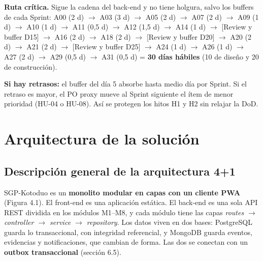 \documentclass[11pt,a4paper]{article}
\begin{document}
\textbf{Ruta crítica.} Sigue la cadena del back-end y no tiene holgura, salvo los buffers de cada Sprint: A00 (2 d) \ensuremath{\rightarrow}\allowbreak{} A03 (3 d) \ensuremath{\rightarrow}\allowbreak{} A05 (2 d) \ensuremath{\rightarrow}\allowbreak{} A07 (2 d) \ensuremath{\rightarrow}\allowbreak{} A09 (1 d) \ensuremath{\rightarrow}\allowbreak{} A10 (1 d) \ensuremath{\rightarrow}\allowbreak{} A11 (0,5 d) \ensuremath{\rightarrow}\allowbreak{} A12 (1,5 d) \ensuremath{\rightarrow}\allowbreak{} A14 (1 d) \ensuremath{\rightarrow}\allowbreak{} [Review y buffer D15] \ensuremath{\rightarrow}\allowbreak{} A16 (2 d) \ensuremath{\rightarrow}\allowbreak{} A18 (2 d) \ensuremath{\rightarrow}\allowbreak{} [Review y buffer D20] \ensuremath{\rightarrow}\allowbreak{} A20 (2 d) \ensuremath{\rightarrow}\allowbreak{} A21 (2 d) \ensuremath{\rightarrow}\allowbreak{} [Review y buffer D25] \ensuremath{\rightarrow}\allowbreak{} A24 (1 d) \ensuremath{\rightarrow}\allowbreak{} A26 (1 d) \ensuremath{\rightarrow}\allowbreak{} A27 (2 d) \ensuremath{\rightarrow}\allowbreak{} A29 (0,5 d) \ensuremath{\rightarrow}\allowbreak{} A31 (0,5 d) = \textbf{30 días hábiles} (10 de diseño y 20 de construcción).

\textbf{Si hay retrasos:} el buffer del día 5 absorbe hasta medio día por Sprint. Si el retraso es mayor, el PO proxy mueve al Sprint siguiente el ítem de menor prioridad (HU-04 o HU-08). Así se protegen los hitos H1 y H2 sin relajar la DoD.

\newpage
\section{Arquitectura de la solución}

\subsection{Descripción general de la arquitectura 4+1}

SGP-Kotoduo es un \textbf{monolito modular en capas con un cliente PWA} (Figura 4.1). El front-end es una aplicación estática. El back-end es una sola API REST dividida en los módulos M1--M8, y cada módulo tiene las capas \textit{routes \ensuremath{\rightarrow}\allowbreak{} controller \ensuremath{\rightarrow}\allowbreak{} service \ensuremath{\rightarrow}\allowbreak{} repository}. Los datos viven en dos bases: PostgreSQL guarda lo transaccional, con integridad referencial, y MongoDB guarda eventos, evidencias y notificaciones, que cambian de forma. Las dos se conectan con un \textbf{outbox transaccional} (sección 6.5).
\end{document}
